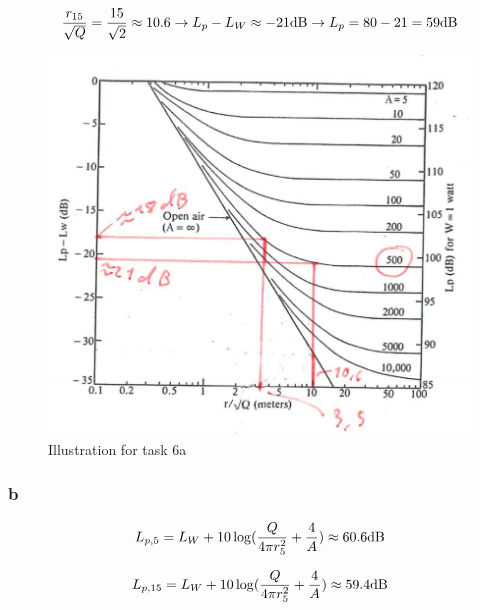 \documentclass{article}
\begin{document}
\begin{equation}
    \frac{r_{15}}{\sqrt{Q}}= \frac{15}{\sqrt{2}} \approx 10.6 \rightarrow L_p - L_W \approx -21 {\rm dB} \rightarrow L_p = 80 - 21 = 59 {\rm dB}
\end{equation}

\begin{figure}[H]
    \centering
    \includegraphics{figures/oving4_1_solution.png}
    \caption{Illustration for task 6a}
    \label{fig:my_label}
\end{figure}

\subsubsection*{b}

\begin{equation}
        L_{p,5} = L_W + 10\log(\frac{Q}{4 \pi r_5^2} + \frac{4}{A}) \approx 60.6 {\rm dB}
\end{equation}

\begin{equation}
        L_{p,15} = L_W + 10\log(\frac{Q}{4 \pi r_5^2} + \frac{4}{A}) \approx 59.4 {\rm dB}
\end{equation}



%
%
\end{document}
